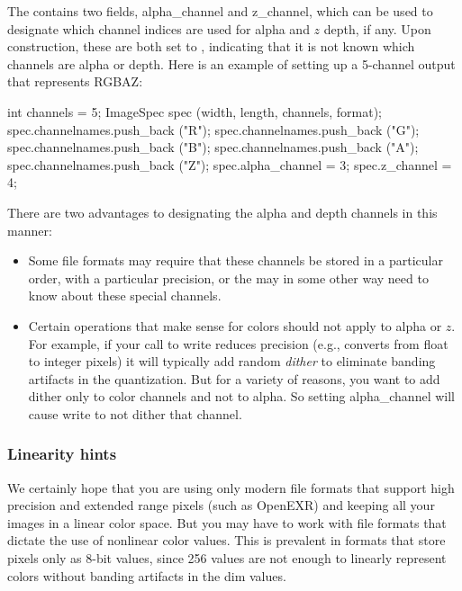 The \ImageSpec contains two fields, {\cf alpha_channel} and {\cf
  z_channel}, which can be used to designate which channel indices are
used for alpha and $z$ depth, if any.  Upon construction, these are both
set to {}, indicating that it is not known which channels 
are alpha or depth.  Here is an example of setting up a 5-channel output
that represents RGBAZ:

\begin{code}
        int channels = 5;
        ImageSpec spec (width, length, channels, format);
        spec.channelnames.push_back ("R");
        spec.channelnames.push_back ("G");
        spec.channelnames.push_back ("B");
        spec.channelnames.push_back ("A");
        spec.channelnames.push_back ("Z");
        spec.alpha_channel = 3;
        spec.z_channel = 4;
\end{code}

There are two advantages to designating the alpha and depth channels in
this manner:  
\begin{itemize}
\item Some file formats may require that these channels be stored in a
  particular order, with a particular precision, or the \ImageOutput may
  in some other way need to know about these special channels.
\item Certain operations that make sense for colors should not apply to
  alpha or $z$.  For example, if your call to {\cf write} reduces
  precision (e.g., converts from {\cf float} to integer pixels) it will
  typically add random \emph{dither} to eliminate banding artifacts
  in the quantization.  But for a variety of reasons, you want to add
  dither only to color channels and not to alpha.  So setting {\cf
    alpha_channel} will cause {\cf write} to not dither that channel.
\end{itemize}

\subsubsection{Linearity hints}

We certainly hope that you are using only modern file formats that
support high precision and extended range pixels (such as OpenEXR) and
keeping all your images in a linear color space.  But you may have to
work with file formats that dictate the use of nonlinear color values.
This is prevalent in formats that store pixels only as 8-bit values,
since 256 values are not enough to linearly represent colors without
banding artifacts in the dim values.


